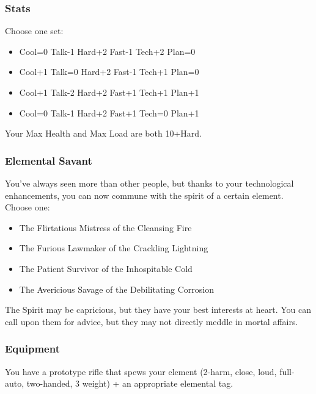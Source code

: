 \subsubsection{Stats}
Choose one set:
\begin{itemize}
\setlength\itemsep{0em}
\item Cool=0 Talk-1 Hard+2 Fast-1 Tech+2 Plan=0
\item Cool+1 Talk=0 Hard+2 Fast-1 Tech+1 Plan=0
\item Cool+1 Talk-2 Hard+2 Fast+1 Tech+1 Plan+1
\item Cool=0 Talk-1 Hard+2 Fast+1 Tech=0 Plan+1
\end{itemize}
Your Max Health and Max Load are both 10+Hard.

\subsubsection{Elemental Savant}
You've always seen more than other people, but thanks to your technological enhancements, you can now commune with the spirit of a certain element. Choose one:
\begin{itemize}
\item The Flirtatious Mistress of the Cleansing Fire
\item The Furious Lawmaker of the Crackling Lightning
\item The Patient Survivor of the Inhospitable Cold
\item The Avericious Savage of the Debilitating Corrosion
\end{itemize}
The Spirit may be capricious, but they have your best interests at heart. You can call upon them for advice, but they may not directly meddle in mortal affairs.



\subsubsection{Equipment}
You have a prototype rifle that spews your element (2-harm, close, loud, full-auto, two-handed, 3 weight) + an appropriate elemental tag.

